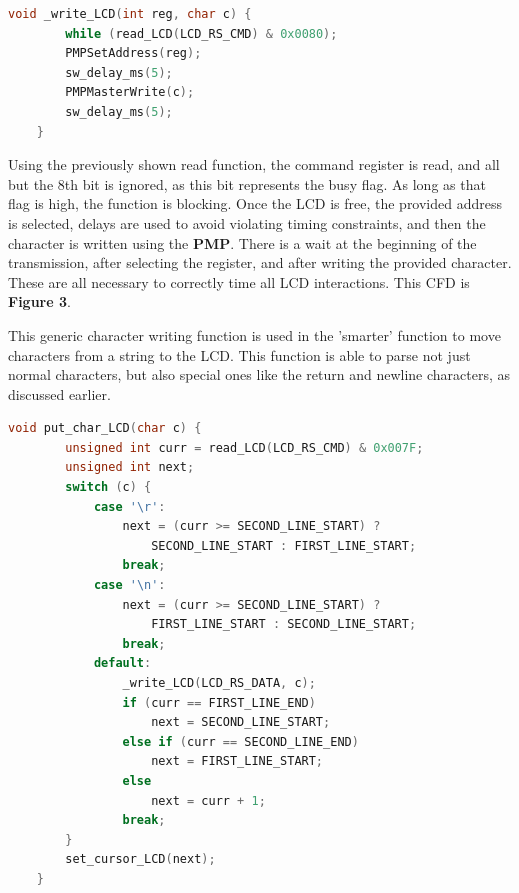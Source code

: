 \documentclass[a4paper, 12pt]{article}
\begin{document}
	\begin{mdframed}[backgroundcolor=code-gray, roundcorner=10pt,
								innerleftmargin=5, innertopmargin=5, innerbottommargin=5]	
	\begin{lstlisting}[language=C, caption=LCD Write Function, tabsize=2]
	void _write_LCD(int reg, char c) {
		while (read_LCD(LCD_RS_CMD) & 0x0080);
		PMPSetAddress(reg);
		sw_delay_ms(5);
		PMPMasterWrite(c);
		sw_delay_ms(5);
	}
	\end{lstlisting}
	\end{mdframed}
	
Using the previously shown read function, the command register is read, and all but the 8th bit is ignored, as this bit represents the busy flag. As long as that flag is high, the function is blocking. Once the LCD is free, the provided address is selected, delays are used to avoid violating timing constraints, and then the character is written using the \textbf{PMP}. There is a wait at the beginning of the transmission, after selecting the register, and after writing the provided character. These are all necessary to correctly time all LCD interactions. This CFD is \textbf{Figure 3}.

This generic character writing function is used in the 'smarter' function to move characters from a string to the LCD. This function is able to parse not just normal characters, but also special ones like the return and newline characters, as discussed earlier.

	\begin{mdframed}[backgroundcolor=code-gray, roundcorner=10pt,
								innerleftmargin=5, innertopmargin=5, innerbottommargin=5]	
	\begin{lstlisting}[language=C, caption=Write ASCII / Non-ASCII Characters to LCD, tabsize=2]
	void put_char_LCD(char c) {
		unsigned int curr = read_LCD(LCD_RS_CMD) & 0x007F;
		unsigned int next;
		switch (c) {
			case '\r':
				next = (curr >= SECOND_LINE_START) ?
					SECOND_LINE_START : FIRST_LINE_START;
				break;
			case '\n':
				next = (curr >= SECOND_LINE_START) ?
					FIRST_LINE_START : SECOND_LINE_START;
				break;
			default:
				_write_LCD(LCD_RS_DATA, c);
				if (curr == FIRST_LINE_END)
					next = SECOND_LINE_START;
				else if (curr == SECOND_LINE_END)
					next = FIRST_LINE_START;
				else
					next = curr + 1;
				break;
		}
		set_cursor_LCD(next);
	}
	\end{lstlisting}
	\end{mdframed}
\end{document}
